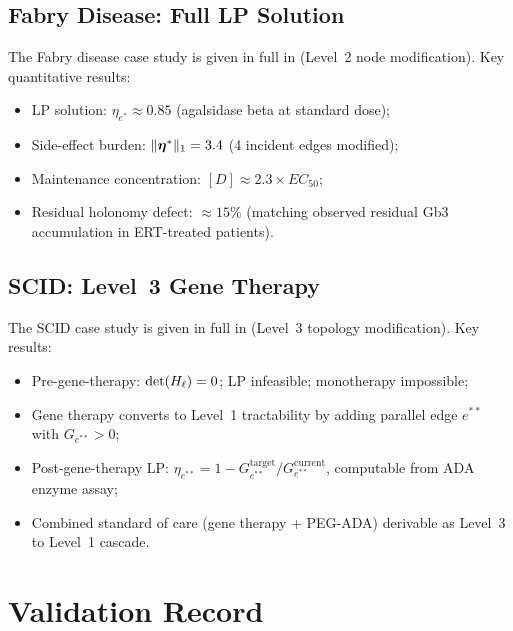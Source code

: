 \subsection{Fabry Disease: Full LP Solution}

The Fabry disease case study is given in full in  (Level~2
node modification).  Key quantitative results:
\begin{itemize}[leftmargin=2em]
  \item LP solution: $\eta_{e^*} \approx 0.85$ (agalsidase beta at standard dose);
  \item Side-effect burden: $\|\boldsymbol{\eta}^*\|_1 = 3.4$ (4 incident edges modified);
  \item Maintenance concentration: $[D] \approx 2.3 \times EC_{50}$;
  \item Residual holonomy defect: $\approx 15\%$ (matching observed residual
    Gb3 accumulation in ERT-treated patients).
\end{itemize}

\subsection{SCID: Level~3 Gene Therapy}

The SCID case study is given in full in  (Level~3 topology
modification).  Key results:
\begin{itemize}[leftmargin=2em]
  \item Pre-gene-therapy: $\det(H_\ell) = 0$; LP infeasible; monotherapy impossible;
  \item Gene therapy converts to Level~1 tractability by adding parallel edge
    $e^{**}$ with $G_{e^{**}} > 0$;
  \item Post-gene-therapy LP: $\eta_{e^{**}} = 1 - G_{e^{**}}^{\mathrm{target}}/G_{e^{**}}^{\mathrm{current}}$,
    computable from ADA enzyme assay;
  \item Combined standard of care (gene therapy + PEG-ADA) derivable as
    Level~3 to Level~1 cascade.
\end{itemize}

\section{Validation Record}
\label{sec:validation}

